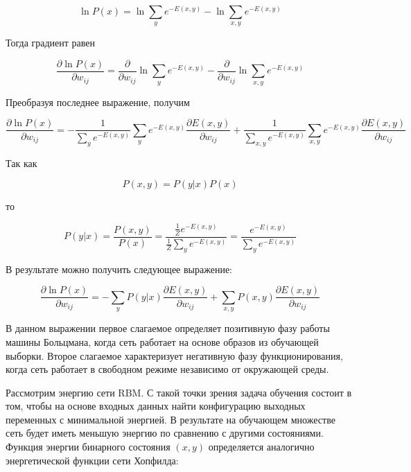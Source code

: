 \begin{equation*}
	\ln P(x)=\ln \sum_y e^{-E(x,y)}-\ln \sum_{x,y} e^{-E(x,y)}
\end{equation*}

Тогда градиент равен

\begin{equation*}
	\frac{\partial \ln P(x)}{\partial w_{ij}}=\frac{\partial}{\partial w_{ij}}\ln \sum_y e^{-E(x,y)}-\frac{\partial}{\partial w_{ij}}\ln\sum_{x,y} e^{-E(x,y)}
\end{equation*}

Преобразуя последнее выражение, получим

\begin{equation*}
	\frac{\partial \ln P(x)}{\partial w_{ij}}=-\frac{1}{\sum_y e^{-E(x,y)}}\sum_y e^{-E(x,y)}\frac{\partial E(x,y)}{\partial w_{ij}}+\frac{1}{\sum_{x,y} e^{-E(x,y)}}\sum_{x,y} e^{-E(x,y)}\frac{\partial E(x,y)}{\partial w_{ij}}
\end{equation*}

Так как

\begin{equation*}
	P(x,y)=P(y \lvert x)P(x)
\end{equation*}

то

\begin{equation*}
	P(y \lvert x) = \frac{P(x,y)}{P(x)}=\frac{\frac{1}{Z}e^{-E(x,y)}}{\frac{1}{Z}\sum_y e^{-E(x,y)}}=\frac{e^{-E(x,y)}}{\sum_y e^{-E(x,y)}}
\end{equation*}

В результате можно получить следующее выражение:

\begin{equation}
	\label{derivative_log}
	\frac{\partial \ln P(x)}{\partial w_{ij}}=-\sum_y P(y \lvert x)\frac{\partial E(x,y)}{\partial w_{ij}} + \sum_{x,y} P(x,y)\frac{\partial E(x,y)}{\partial w_{ij}}
\end{equation}

В данном выражении первое слагаемое определяет позитивную фазу работы машины Больцмана, когда сеть работает на основе образов из обучающей выборки. Второе слагаемое характеризует негативную фазу функционирования, когда сеть работает в свободном режиме независимо от окружающей среды.

Рассмотрим энергию сети RBM. С такой точки зрения задача обучения состоит в том, чтобы на основе входных данных найти конфигурацию выходных переменных с минимальной энергией. В результате на обучающем множестве сеть будет иметь меньшую энергию по сравнению с другими состояниями. Функция энергии бинарного состояния $(x,y)$ определяется аналогично энергетической функции сети Хопфилда:

